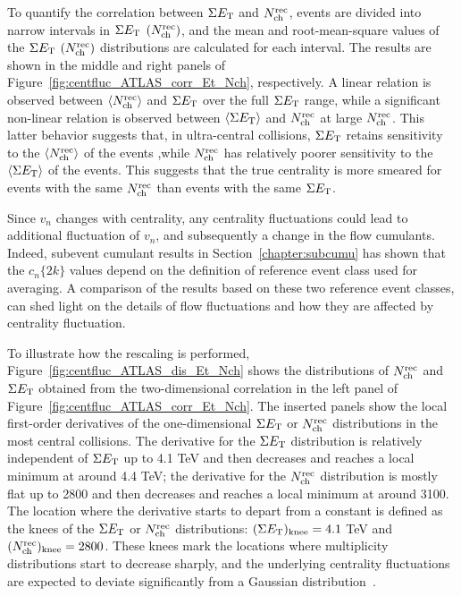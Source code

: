 To quantify the correlation between $\Sigma E_\text{T}$ and $N_\text{ch}^\text{rec}$, events are divided into narrow intervals in $\Sigma E_\text{T}$ $(N_\text{ch}^\text{rec})$, and the mean and root-mean-square values of the $\Sigma E_\text{T}$ $(N_\text{ch}^\text{rec})$ distributions are calculated for each interval. The results are shown in the middle and right panels of Figure~\ref{fig:centfluc_ATLAS_corr_Et_Nch}, respectively. A linear relation is observed between $\left\langle N_\text{ch}^\text{rec}\right\rangle$ and $\Sigma E_\text{T}$ over the full $\Sigma E_\text{T}$ range, while a significant non-linear relation is observed between $\left\langle \Sigma E_\text{T}\right\rangle$ and $N_\text{ch}^\text{rec}$ at large $N_\text{ch}^\text{rec}$. This latter behavior suggests that, in ultra-central collisions, $\Sigma E_\text{T}$ retains sensitivity to the $\left\langle N_\text{ch}^\text{rec}\right\rangle$ of the events ,while $N_\text{ch}^\text{rec}$ has relatively poorer sensitivity to the $\left\langle \Sigma E_\text{T}\right\rangle$ of the events. This suggests that the true centrality is more smeared for events with the same $N_\text{ch}^\text{rec}$ than events with the same $\Sigma E_\text{T}$.

Since $v_n$ changes with centrality, any centrality fluctuations could lead to additional fluctuation of $v_n$, and subsequently a change in the flow cumulants. Indeed, subevent cumulant results in Section~\ref{chapter:subcumu} has shown that the $c_n\{2k\}$ values depend on the definition of reference event class used for averaging. A comparison of the results based on these two reference event classes, can shed light on the details of flow fluctuations and how they are affected by centrality fluctuation.

To illustrate how the rescaling is performed, Figure~\ref{fig:centfluc_ATLAS_dis_Et_Nch} shows the distributions of $N_\text{ch}^\text{rec}$ and $\Sigma E_\text{T}$ obtained from the two-dimensional correlation in the left panel of Figure~\ref{fig:centfluc_ATLAS_corr_Et_Nch}. The inserted panels show the local first-order derivatives of the one-dimensional $\Sigma E_\text{T}$ or $N_\text{ch}^\text{rec}$ distributions in the most central collisions. The derivative for the $\Sigma E_\text{T}$ distribution is relatively independent of $\Sigma E_\text{T}$ up to 4.1 TeV and then decreases and reaches a local minimum at around 4.4 TeV; the derivative for the $N_\text{ch}^\text{rec}$ distribution is mostly flat up to 2800 and then decreases and reaches a local minimum at around 3100. The location where the derivative starts to depart from a constant is defined as the knees of the $\Sigma E_\text{T}$ or $N_\text{ch}^\text{rec}$ distributions: $(\Sigma E_\text{T})_\text{knee} = 4.1$ TeV and $(N_\text{ch}^\text{rec})_\text{knee} = 2800$. These knees mark the locations where multiplicity distributions start to decrease sharply, and the underlying centrality fluctuations are expected to deviate significantly from a Gaussian distribution~\cite{Zhou:2018fxx, Xu:2016qzd}.

